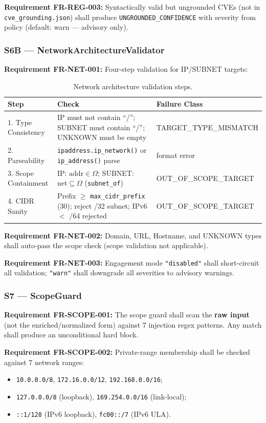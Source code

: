 ﻿\documentclass[10pt,journal,onecolumn]{IEEEtran}
\newcommand{\reqid}[1]{\textbf{#1}}
\begin{document}
\reqid{Requirement FR-REG-003:} Syntactically valid but ungrounded CVEs (not in \texttt{cve\_grounding.json}) shall produce \texttt{UNGROUNDED\_CONFIDENCE} with severity from policy (default: warn --- advisory only).

\subsubsection{S6B --- NetworkArchitectureValidator}
\reqid{Requirement FR-NET-001:} Four-step validation for IP/SUBNET targets:
\begin{table}[t]
\caption{Network architecture validation steps.}
\label{tab:net}
\begin{tabularx}{\textwidth}{l X >{\raggedright\arraybackslash}p{}}
\toprule
\textbf{Step} & \textbf{Check} & \textbf{Failure Class}\\
\midrule
1. Type Consistency & IP must not contain ``/''; SUBNET must contain ``/''; UNKNOWN must be empty & TARGET\_TYPE\_MISMATCH\\
2. Parseability & \texttt{ipaddress.ip\_network()} or \texttt{ip\_address()} parse & format error\\
3. Scope Containment & IP: $\mathrm{addr} \in \Omega$; SUBNET: $\mathrm{net} \subseteq \Omega$ (\texttt{subnet\_of}) & OUT\_OF\_SCOPE\_TARGET\\
4. CIDR Sanity & Prefix $\geq$ \texttt{max\_cidr\_prefix} (30); reject /32 subnet; IPv6 $<$ /64 rejected & OUT\_OF\_SCOPE\_TARGET\\
\bottomrule
\end{tabularx}
\end{table}

\reqid{Requirement FR-NET-002:} Domain, URL, Hostname, and UNKNOWN types shall auto-pass the scope check (scope validation not applicable).

\reqid{Requirement FR-NET-003:} Engagement mode \texttt{"disabled"} shall short-circuit all validation; \texttt{"warn"} shall downgrade all severities to advisory warnings.

\subsubsection{S7 --- ScopeGuard}
\reqid{Requirement FR-SCOPE-001:} The scope guard shall scan the \textbf{raw input} (not the enriched/normalized form) against 7 injection regex patterns. Any match shall produce an unconditional hard block.

\reqid{Requirement FR-SCOPE-002:} Private-range membership shall be checked against 7 network ranges:
\begin{itemize}
\item \texttt{10.0.0.0/8}, \texttt{172.16.0.0/12}, \texttt{192.168.0.0/16};
\item \texttt{127.0.0.0/8} (loopback), \texttt{169.254.0.0/16} (link-local);
\item \texttt{::1/128} (IPv6 loopback), \texttt{fc00::/7} (IPv6 ULA).
\end{itemize}
\end{document}
